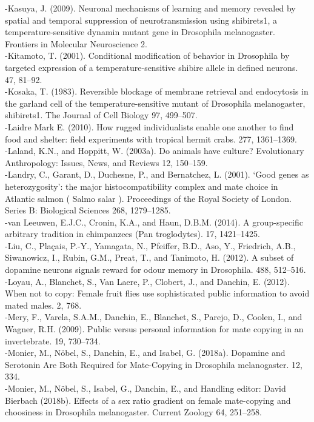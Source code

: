 \documentclass[a4paper, 12pt]{article}
\begin{document}
\begin{singlespace}
{-Kasuya, J. (2009). Neuronal mechanisms of learning and memory revealed by spatial and temporal suppression of neurotransmission using shibirets1, a temperature-sensitive dynamin mutant gene in Drosophila melanogaster. Frontiers in Molecular Neuroscience 2.\\
-Kitamoto, T. (2001). Conditional modification of behavior in Drosophila by targeted expression of a temperature-sensitive shibire allele in defined neurons. 47, 81–92.\\
-Kosaka, T. (1983). Reversible blockage of membrane retrieval and endocytosis in the garland cell of the temperature-sensitive mutant of Drosophila melanogaster, shibirets1. The Journal of Cell Biology 97, 499–507.\\
-Laidre Mark E. (2010). How rugged individualists enable one another to find food and shelter: field experiments with tropical hermit crabs. 277, 1361–1369.\\
-Laland, K.N., and Hoppitt, W. (2003a). Do animals have culture? Evolutionary Anthropology: Issues, News, and Reviews 12, 150–159.\\
-Landry, C., Garant, D., Duchesne, P., and Bernatchez, L. (2001). ‘Good genes as heterozygosity’: the major histocompatibility complex and mate choice in Atlantic salmon ( Salmo salar ). Proceedings of the Royal Society of London. Series B: Biological Sciences 268, 1279–1285.\\
-van Leeuwen, E.J.C., Cronin, K.A., and Haun, D.B.M. (2014). A group-specific arbitrary tradition in chimpanzees (Pan troglodytes). 17, 1421–1425.\\
-Liu, C., Plaçais, P.-Y., Yamagata, N., Pfeiffer, B.D., Aso, Y., Friedrich, A.B., Siwanowicz, I., Rubin, G.M., Preat, T., and Tanimoto, H. (2012). A subset of dopamine neurons signals reward for odour memory in Drosophila. 488, 512–516.\\
-Loyau, A., Blanchet, S., Van Laere, P., Clobert, J., and Danchin, E. (2012). When not to copy: Female fruit flies use sophisticated public information to avoid mated males. 2, 768.\\
-Mery, F., Varela, S.A.M., Danchin, E., Blanchet, S., Parejo, D., Coolen, I., and Wagner, R.H. (2009). Public versus personal information for mate copying in an invertebrate. 19, 730–734.\\
-Monier, M., Nöbel, S., Danchin, E., and Isabel, G. (2018a). Dopamine and Serotonin Are Both Required for Mate-Copying in Drosophila melanogaster. 12, 334.\\
-Monier, M., Nöbel, S., Isabel, G., Danchin, E., and Handling editor: David Bierbach (2018b). Effects of a sex ratio gradient on female mate-copying and choosiness in Drosophila melanogaster. Current Zoology 64, 251–258.\\
}
\end{singlespace}
\end{document}
